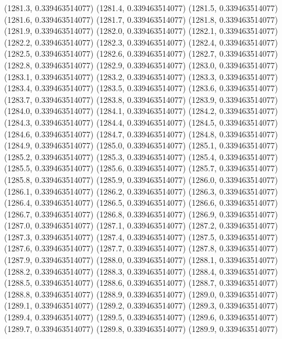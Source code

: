 {					(1281.3, 0.339463514077)
					(1281.4, 0.339463514077)
					(1281.5, 0.339463514077)
					(1281.6, 0.339463514077)
					(1281.7, 0.339463514077)
					(1281.8, 0.339463514077)
					(1281.9, 0.339463514077)
					(1282.0, 0.339463514077)
					(1282.1, 0.339463514077)
					(1282.2, 0.339463514077)
					(1282.3, 0.339463514077)
					(1282.4, 0.339463514077)
					(1282.5, 0.339463514077)
					(1282.6, 0.339463514077)
					(1282.7, 0.339463514077)
					(1282.8, 0.339463514077)
					(1282.9, 0.339463514077)
					(1283.0, 0.339463514077)
					(1283.1, 0.339463514077)
					(1283.2, 0.339463514077)
					(1283.3, 0.339463514077)
					(1283.4, 0.339463514077)
					(1283.5, 0.339463514077)
					(1283.6, 0.339463514077)
					(1283.7, 0.339463514077)
					(1283.8, 0.339463514077)
					(1283.9, 0.339463514077)
					(1284.0, 0.339463514077)
					(1284.1, 0.339463514077)
					(1284.2, 0.339463514077)
					(1284.3, 0.339463514077)
					(1284.4, 0.339463514077)
					(1284.5, 0.339463514077)
					(1284.6, 0.339463514077)
					(1284.7, 0.339463514077)
					(1284.8, 0.339463514077)
					(1284.9, 0.339463514077)
					(1285.0, 0.339463514077)
					(1285.1, 0.339463514077)
					(1285.2, 0.339463514077)
					(1285.3, 0.339463514077)
					(1285.4, 0.339463514077)
					(1285.5, 0.339463514077)
					(1285.6, 0.339463514077)
					(1285.7, 0.339463514077)
					(1285.8, 0.339463514077)
					(1285.9, 0.339463514077)
					(1286.0, 0.339463514077)
					(1286.1, 0.339463514077)
					(1286.2, 0.339463514077)
					(1286.3, 0.339463514077)
					(1286.4, 0.339463514077)
					(1286.5, 0.339463514077)
					(1286.6, 0.339463514077)
					(1286.7, 0.339463514077)
					(1286.8, 0.339463514077)
					(1286.9, 0.339463514077)
					(1287.0, 0.339463514077)
					(1287.1, 0.339463514077)
					(1287.2, 0.339463514077)
					(1287.3, 0.339463514077)
					(1287.4, 0.339463514077)
					(1287.5, 0.339463514077)
					(1287.6, 0.339463514077)
					(1287.7, 0.339463514077)
					(1287.8, 0.339463514077)
					(1287.9, 0.339463514077)
					(1288.0, 0.339463514077)
					(1288.1, 0.339463514077)
					(1288.2, 0.339463514077)
					(1288.3, 0.339463514077)
					(1288.4, 0.339463514077)
					(1288.5, 0.339463514077)
					(1288.6, 0.339463514077)
					(1288.7, 0.339463514077)
					(1288.8, 0.339463514077)
					(1288.9, 0.339463514077)
					(1289.0, 0.339463514077)
					(1289.1, 0.339463514077)
					(1289.2, 0.339463514077)
					(1289.3, 0.339463514077)
					(1289.4, 0.339463514077)
					(1289.5, 0.339463514077)
					(1289.6, 0.339463514077)
					(1289.7, 0.339463514077)
					(1289.8, 0.339463514077)
					(1289.9, 0.339463514077)
}

